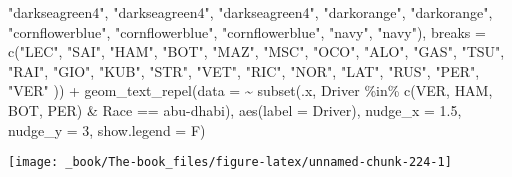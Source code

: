 \documentclass[
]{book}
\newenvironment{Shaded}{\begin{snugshade}}{\end{snugshade}}
\newcommand{\AttributeTok}[1]{\textcolor[rgb]{0.77,0.63,0.00}{#1}}
\newcommand{\DecValTok}[1]{\textcolor[rgb]{0.00,0.00,0.81}{#1}}
\newcommand{\FloatTok}[1]{\textcolor[rgb]{0.00,0.00,0.81}{#1}}
\newcommand{\FunctionTok}[1]{\textcolor[rgb]{0.00,0.00,0.00}{#1}}
\newcommand{\NormalTok}[1]{#1}
\newcommand{\SpecialCharTok}[1]{\textcolor[rgb]{0.00,0.00,0.00}{#1}}
\newcommand{\StringTok}[1]{\textcolor[rgb]{0.31,0.60,0.02}{#1}}
\begin{document}
\begin{Shaded}
\begin{Highlighting}[]
                                \StringTok{"darkseagreen4"}\NormalTok{, }\StringTok{"darkseagreen4"}\NormalTok{, }\StringTok{"darkseagreen4"}\NormalTok{,}
                                \StringTok{"darkorange"}\NormalTok{, }\StringTok{"darkorange"}\NormalTok{,}
                                \StringTok{"cornflowerblue"}\NormalTok{, }\StringTok{"cornflowerblue"}\NormalTok{, }\StringTok{"cornflowerblue"}\NormalTok{,}
                                \StringTok{"navy"}\NormalTok{, }\StringTok{"navy"}\NormalTok{),}
                     \AttributeTok{breaks =} \FunctionTok{c}\NormalTok{(}\StringTok{"LEC"}\NormalTok{, }\StringTok{"SAI"}\NormalTok{,}
                                \StringTok{"HAM"}\NormalTok{, }\StringTok{"BOT"}\NormalTok{, }
                                \StringTok{"MAZ"}\NormalTok{, }\StringTok{"MSC"}\NormalTok{, }
                                \StringTok{"OCO"}\NormalTok{, }\StringTok{"ALO"}\NormalTok{,}
                                \StringTok{"GAS"}\NormalTok{, }\StringTok{"TSU"}\NormalTok{,  }
                                \StringTok{"RAI"}\NormalTok{, }\StringTok{"GIO"}\NormalTok{, }\StringTok{"KUB"}\NormalTok{,}
                                \StringTok{"STR"}\NormalTok{, }\StringTok{"VET"}\NormalTok{,  }
                                \StringTok{"RIC"}\NormalTok{, }\StringTok{"NOR"}\NormalTok{,}
                                \StringTok{"LAT"}\NormalTok{, }\StringTok{"RUS"}\NormalTok{,}
                                \StringTok{"PER"}\NormalTok{, }\StringTok{"VER"}
\NormalTok{                                )) }\SpecialCharTok{+}
  \FunctionTok{geom\_text\_repel}\NormalTok{(}\AttributeTok{data =} \SpecialCharTok{\textasciitilde{}} \FunctionTok{subset}\NormalTok{(.x, Driver }\SpecialCharTok{\%in\%} \FunctionTok{c}\NormalTok{(}\StringTok{\textquotesingle{}VER\textquotesingle{}}\NormalTok{, }\StringTok{\textquotesingle{}HAM\textquotesingle{}}\NormalTok{, }\StringTok{\textquotesingle{}BOT\textquotesingle{}}\NormalTok{, }\StringTok{\textquotesingle{}PER\textquotesingle{}}\NormalTok{) }\SpecialCharTok{\&}\NormalTok{ Race }\SpecialCharTok{==} \StringTok{\textquotesingle{}abu{-}dhabi\textquotesingle{}}\NormalTok{),}
            \FunctionTok{aes}\NormalTok{(}\AttributeTok{label =}\NormalTok{ Driver),}
            \AttributeTok{nudge\_x =} \FloatTok{1.5}\NormalTok{, }\AttributeTok{nudge\_y =} \DecValTok{3}\NormalTok{, }\AttributeTok{show.legend =}\NormalTok{ F)}
\end{Highlighting}
\end{Shaded}

\begin{center}\texttt{[image: \_book/The-book\_files/figure-latex/unnamed-chunk-224-1]} \end{center}
\end{document}
